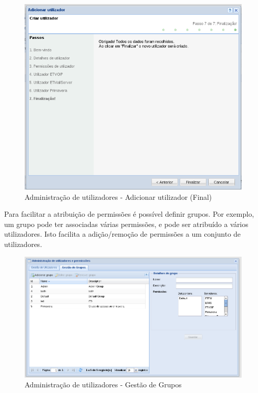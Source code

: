 {\begin{figure}[H]
        \begin{center}
        \includegraphics[scale=0.4]{screenshots/users/etva/create_user_wiz_07.png}
        \caption{Administração de utilizadores - Adicionar utilizador (Final)}
        \label{fig:create_user_wiz_07}
        \end{center}
\end{figure}

}

Para facilitar a atribuição de permissões é possível definir grupos. Por exemplo, um grupo pode ter associadas várias permissões, e pode ser atribuído a vários utilizadores. Isto facilita a adição/remoção de permissões a um conjunto de utilizadores.

\begin{figure}[H]
        \begin{center}
        \includegraphics[scale=0.4]{screenshots/users/admin_users_groups.png}
        \caption{Administração de utilizadores - Gestão de Grupos}
        \label{fig:admin_users_groups}
        \end{center}
\end{figure}

